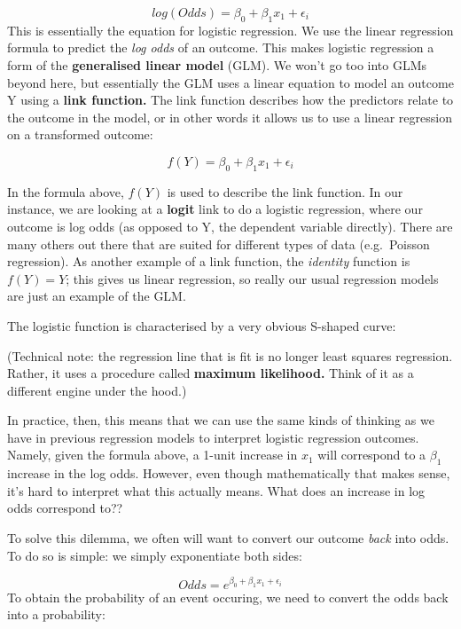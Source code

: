\documentclass[
]{book}
\begin{document}
\[
log(Odds) = \beta_0 + \beta_1 x_1 + \epsilon_i
\]
This is essentially the equation for logistic regression. We use the linear regression formula to predict the \emph{log odds} of an outcome. This makes logistic regression a form of the \textbf{generalised linear model} (GLM). We won't go too into GLMs beyond here, but essentially the GLM uses a linear equation to model an outcome Y using a \textbf{link function.} The link function describes how the predictors relate to the outcome in the model, or in other words it allows us to use a linear regression on a transformed outcome:

\[
f(Y) = \beta_0 + \beta_1 x_1 + \epsilon_i
\]

In the formula above, \(f(Y)\) is used to describe the link function. In our instance, we are looking at a \textbf{logit} link to do a logistic regression, where our outcome is log odds (as opposed to Y, the dependent variable directly). There are many others out there that are suited for different types of data (e.g.~Poisson regression). As another example of a link function, the \emph{identity} function is \(f(Y) = Y\); this gives us linear regression, so really our usual regression models are just an example of the GLM.

The logistic function is characterised by a very obvious S-shaped curve:



(Technical note: the regression line that is fit is no longer least squares regression. Rather, it uses a procedure called \textbf{maximum likelihood.} Think of it as a different engine under the hood.)

In practice, then, this means that we can use the same kinds of thinking as we have in previous regression models to interpret logistic regression outcomes. Namely, given the formula above, a 1-unit increase in \(x_1\) will correspond to a \(\beta_1\) increase in the log odds. However, even though mathematically that makes sense, it's hard to interpret what this actually means. What does an increase in log odds correspond to??

To solve this dilemma, we often will want to convert our outcome \emph{back} into odds. To do so is simple: we simply exponentiate both sides:

\[
Odds = e^{\beta_0 + \beta_1 x_1 + \epsilon_i}
\]
To obtain the probability of an event occuring, we need to convert the odds back into a probability:
\end{document}
